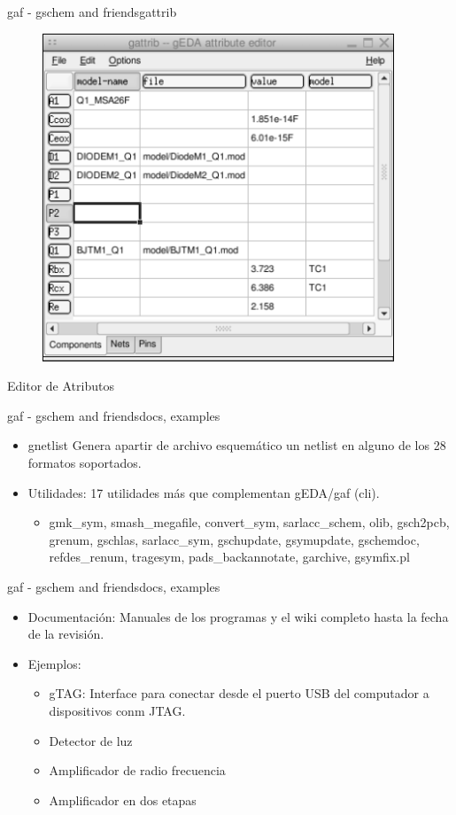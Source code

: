 \documentclass{beamer}
\begin{document}
\begin{frame}{gaf - gschem and friends}{gattrib}
  \begin{figure}[!h]
    \centering
    \includegraphics[scale=0.4]{img/gattrib.png}
  \end{figure}
  Editor de Atributos
\end{frame}

\begin{frame}{gaf - gschem and friends}{docs, examples}
  \begin{itemize}
  \item \alert{gnetlist} Genera apartir de archivo esquemático un netlist en alguno de los 28 formatos soportados.
    \pause
  \item Utilidades: 17 utilidades más que complementan gEDA/gaf (cli).
    \begin{itemize}
    \item gmk\_sym, smash\_megafile, convert\_sym, sarlacc\_schem, olib, gsch2pcb, grenum, gschlas, sarlacc\_sym, gschupdate, gsymupdate, gschemdoc, refdes\_renum, tragesym, pads\_backannotate, garchive, gsymfix.pl
    \end{itemize}
  \end{itemize}
\end{frame}

\begin{frame}{gaf - gschem and friends}{docs, examples}
  \begin{itemize}
  \item Documentación: Manuales de los programas y el wiki completo hasta la fecha de la revisión.
    \pause
  \item Ejemplos:
    \begin{itemize}
    \item gTAG: Interface para conectar desde el puerto USB del computador a dispositivos conm JTAG.
    \item Detector de luz
    \item Amplificador de radio frecuencia
    \item Amplificador en dos etapas
    \end{itemize}
  \end{itemize}
\end{frame}
\end{document}

